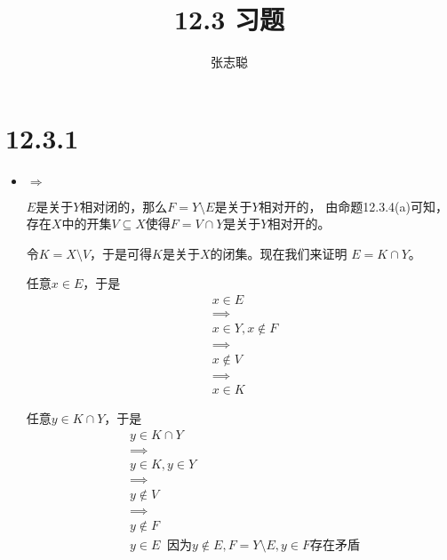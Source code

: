 \documentclass{article}
\begin{document}
\title{12.3 习题}
\author{张志聪}
\maketitle

\section*{12.3.1}

\begin{itemize}
  \item $\Rightarrow$

        $E$是关于$Y$相对闭的，那么$F = Y \setminus E$是关于$Y$相对开的，
        由命题12.3.4(a)可知，存在$X$中的开集$V \subseteq X$使得$F = V \cap Y$是关于$Y$相对开的。

        令$K = X \setminus V$，于是可得$K$是关于$X$的闭集。现在我们来证明
        $E = K \cap Y$。

        任意$x \in E$，于是
        \begin{align*}
           & x \in E             \\
           & \implies            \\
           & x \in Y, x \notin F \\
           & \implies            \\
           & x \notin V          \\
           & \implies            \\
           & x \in K
        \end{align*}

        任意$y \in K \cap Y$，于是
        \begin{align*}
           & y \in K \cap Y                                                             \\
           & \implies                                                                   \\
           & y \in K, y \in Y                                                           \\
           & \implies                                                                   \\
           & y \notin V                                                                 \\
           & \implies                                                                   \\
           & y \notin F                                                                 \\
           & y \in E       \;\;   \text{因为$y \notin E, F = Y \setminus E, y \in F$存在矛盾} \\
        \end{align*}


\end{itemize}
\end{document}
